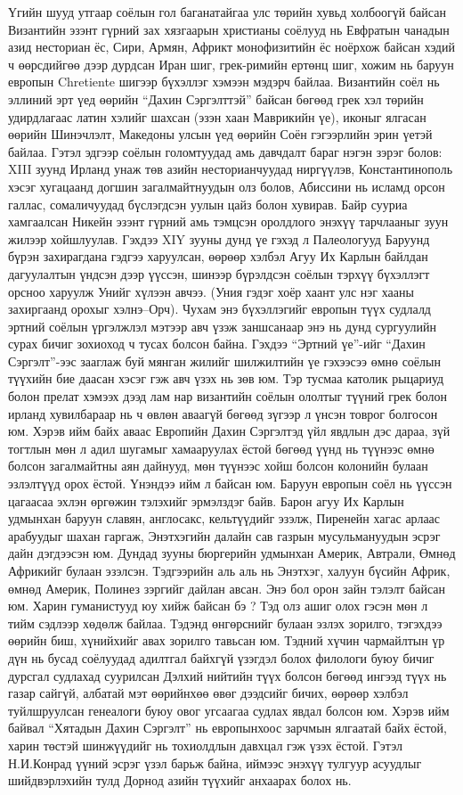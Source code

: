 Үгийн шууд утгаар соёлын гол баганатайгаа улс төрийн хувьд холбоогүй байсан Византийн эзэнт гүрний зах хязгаарын христианы соёлууд нь Евфратын чанадын азид несториан ёс, Сири, Армян, Африкт монофизитийн ёс ноёрхож байсан хэдий ч өөрсдийгөө дээр дурдсан Иран шиг, грек-римийн ертөнц шиг, хожим нь баруун европын Chretiente шигээр бүхэллэг хэмээн мэдэрч байлаа. Византийн соёл нь эллиний эрт үед өөрийн “Дахин Сэргэлттэй” байсан бөгөөд грек хэл төрийн удирдлагаас латин хэлийг шахсан (эзэн хаан Маврикийн үе), иконыг ялгасан өөрийн Шинэчлэлт, Македоны улсын үед өөрийн Соён гэгээрлийн эрин үетэй байлаа. Гэтэл эдгээр соёлын голомтуудад амь давчдалт бараг нэгэн зэрэг болов: XIII зуунд Ирланд унаж төв азийн несторианчуудад ниргүүлэв, Константинополь хэсэг хугацаанд догшин загалмайтнуудын олз болов, Абиссини нь исламд орсон галлас, сомаличуудад бүслэгдсэн уулын цайз болон хувирав. Байр сууриа хамгаалсан Никейн эзэнт гүрний амь тэмцсэн оролдлого энэхүү тарчлааныг зуун жилээр хойшлуулав. Гэхдээ XIY зууны дунд үе гэхэд л Палеологууд Баруунд бүрэн захирагдана гэдгээ харуулсан, өөрөөр хэлбэл Агуу Их Карлын байлдан дагуулалтын үндсэн дээр үүссэн, шинээр бүрэлдсэн соёлын тэрхүү бүхэллэгт орсноо харуулж Унийг хүлээн авчээ. (Уния гэдэг хоёр хаант улс нэг хааны захиргаанд орохыг хэлнэ–Орч). Чухам энэ бүхэллэгийг европын түүх судлалд эртний соёлын үргэлжлэл мэтээр авч үзэж заншсанаар энэ нь дунд сургуулийн сурах бичиг зохиоход ч тусах болсон байна. Гэхдээ “Эртний үе”-ийг “Дахин Сэргэлт”-ээс зааглаж буй мянган жилийг шилжилтийн үе гэхээсээ өмнө соёлын түүхийн бие даасан хэсэг гэж авч үзэх нь зөв юм. Тэр тусмаа католик рыцариуд болон прелат хэмээх дээд лам нар византийн соёлын ололтыг түүний грек болон ирланд хувилбараар нь ч өвлөн аваагүй бөгөөд зүгээр л үнсэн товрог болгосон юм.
Хэрэв ийм байх аваас Европийн Дахин Сэргэлтэд үйл явдлын дэс дараа, зүй тогтлын мөн л адил шугамыг хамааруулах ёстой бөгөөд үүнд нь түүнээс өмнө болсон загалмайтны аян дайнууд, мөн түүнээс хойш болсон колонийн булаан эзлэлтүүд орох ёстой. Үнэндээ ийм л байсан юм.
Баруун европын соёл нь үүссэн цагаасаа эхлэн өргөжин тэлэхийг эрмэлздэг байв. Барон агуу Их Карлын удмынхан баруун славян, англосакс, кельтүүдийг эзэлж, Пиренейн хагас арлаас арабуудыг шахан гаргаж, Энэтхэгийн далайн сав газрын мусульмануудын эсрэг дайн дэгдээсэн юм. Дундад зууны бюргерийн удмынхан Америк, Автрали, Өмнөд Африкийг булаан эзэлсэн. Тэдгээрийн аль аль нь Энэтхэг, халуун бүсийн Африк, өмнөд Америк, Полинез зэргийг дайлан авсан. Энэ бол орон зайн тэлэлт байсан юм. Харин гуманистууд юу хийж байсан бэ ? Тэд олз ашиг олох гэсэн мөн л тийм сэдлээр хөдөлж байлаа. Тэдэнд өнгөрснийг булаан эзлэх зорилго, тэгэхдээ өөрийн биш, хүнийхийг авах зорилго тавьсан юм. Тэдний хүчин чармайлтын үр дүн нь бусад соёлуудад адилтгал байхгүй үзэгдэл болох филологи буюу бичиг дурсгал судлахад суурилсан Дэлхий нийтийн түүх болсон бөгөөд ингээд түүх нь газар сайгүй, албатай мэт өөрийнхөө өвөг дээдсийг бичих, өөрөөр хэлбэл туйлшруулсан генеалоги буюу овог угсаагаа судлах явдал болсон юм. Хэрэв ийм байвал “Хятадын Дахин Сэргэлт” нь европынхоос зарчмын ялгаатай байх ёстой, харин төстэй шинжүүдийг нь тохиолдлын давхцал гэж үзэх ёстой. Гэтэл Н.И.Конрад үүний эсрэг үзэл барьж байна, иймээс энэхүү тулгуур асуудлыг шийдвэрлэхийн тулд Дорнод азийн түүхийг анхаарах болох нь.
